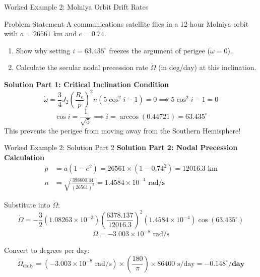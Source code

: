 \documentclass[aspectratio=169,11pt]{beamer}
\begin{document}
\begin{frame}{Worked Example 2: Molniya Orbit Drift Rates}
    \begin{exampleblock}{Problem Statement}
        A communications satellite flies in a 12-hour Molniya orbit with $a = 26561\text{ km}$ and $e = 0.74$. 
        \begin{enumerate}
            \item Show why setting $i = 63.435^\circ$ freezes the argument of perigee ($\dot{\omega} = 0$).
            \item Calculate the secular nodal precession rate $\dot{\Omega}$ (in deg/day) at this inclination.
        \end{enumerate}
    \end{exampleblock}

    \textbf{Solution Part 1: Critical Inclination Condition}
    $$\dot{\omega} = \frac{3}{4} J_2 \left(\frac{R_e}{p}\right)^2 n \left( 5\cos^2 i - 1 \right) = 0 \implies 5\cos^2 i - 1 = 0$$
    $$\cos i = \frac{1}{\sqrt{5}} \implies i = \arccos(0.44721) = \mathbf{63.435^\circ}$$
    This prevents the perigee from moving away from the Southern Hemisphere!
\end{frame}

\begin{frame}{Worked Example 2: Solution Part 2}
    \textbf{Solution Part 2: Nodal Precession Calculation}
    \begin{align*}
        p &= a(1 - e^2) = 26561 \times (1 - 0.74^2) = 12016.3\text{ km} \\
        n &= \sqrt{\frac{398600.44}{(26561)^3}} = 1.4584 \times 10^{-4}\text{ rad/s}
    \end{align*}

    Substitute into $\dot{\Omega}$:
    $$\dot{\Omega} = -\frac{3}{2} (1.08263 \times 10^{-3}) \left(\frac{6378.137}{12016.3}\right)^2 (1.4584 \times 10^{-4}) \cos(63.435^\circ)$$
    $$\dot{\Omega} = -3.003 \times 10^{-8}\text{ rad/s}$$

    Convert to degrees per day:
    $$\dot{\Omega}_{\text{daily}} = (-3.003 \times 10^{-8}\text{ rad/s}) \times \left(\frac{180}{\pi}\right) \times 86400\text{ s/day} = \mathbf{-0.148^\circ/\text{day}}$$
\end{frame}
\end{document}

